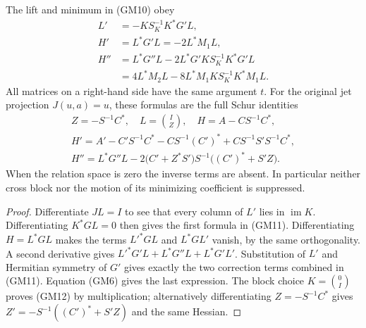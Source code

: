 \begin{hzoctheorem}
The lift and minimum in (GM10) obey
\begin{equation}\tag{GM11}
 \begin{split}
 L'&=-K S_K^{-1}K^*G'L,\\
 H'&=L^*G'L=-2L^*M_1L,\\
 H''&=L^*G''L-2L^*G'K S_K^{-1}K^*G'L\\
     &=4L^*M_2L-8L^*M_1K S_K^{-1}K^*M_1L.
 \end{split}
\end{equation}
All matrices on a right-hand side have the same argument $t$.
For the original jet projection $J(u,a)=u$, these formulas are the
full Schur identities
\begin{equation}\tag{GM12}
 \begin{gathered}
 Z=-S^{-1}C^*,\quad L=\binom{I}{Z},\quad H=A-CS^{-1}C^*,\\
 H'=A'-C'S^{-1}C^*-CS^{-1}(C')^*
                       +CS^{-1}S'S^{-1}C^*,\\
 H''=L^*G''L
     -2\bigl(C'+Z^*S'\bigr)S^{-1}\bigl((C')^*+S'Z\bigr).
 \end{gathered}
\end{equation}
When the relation space is zero the inverse terms are absent.
In particular neither cross block nor the motion of its minimizing
coefficient is suppressed.
\end{hzoctheorem}
\begin{proof}
Differentiate $JL=I$ to see that every column of $L'$ lies in
$\operatorname{im}K$.  Differentiating $K^*GL=0$ then gives the first
formula in (GM11).  Differentiating $H=L^*GL$ makes the terms
$L'^*GL$ and $L^*GL'$ vanish, by the same orthogonality.  A second
derivative gives $L'^*G'L+L^*G''L+L^*G'L'$.  Substitution of $L'$
and Hermitian symmetry of $G'$ gives exactly the two correction terms
combined in (GM11).  Equation (GM6) gives the last expression.
The block choice $K=\binom0I$ proves (GM12) by multiplication;
alternatively differentiating $Z=-S^{-1}C^*$ gives
$Z'=-S^{-1}((C')^*+S'Z)$ and the same Hessian.
\end{proof}

